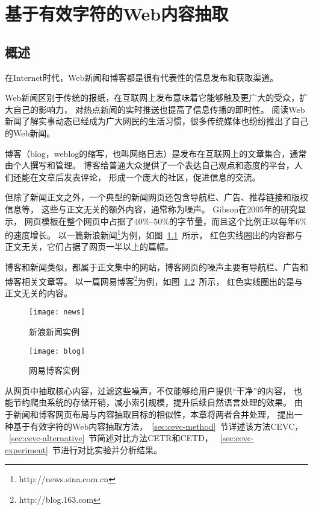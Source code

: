 
\chapter{基于有效字符的Web内容抽取}

\section{概述}
在Internet时代，Web新闻和博客都是很有代表性的信息发布和获取渠道。

Web新闻区别于传统的报纸，在互联网上发布意味着它能够触及更广大的受众，扩大自己的影响力，
对热点新闻的实时推送也提高了信息传播的即时性。
阅读Web新闻了解实事动态已经成为广大网民的生活习惯，很多传统媒体也纷纷推出了自己的Web新闻。

博客（blog，weblog的缩写，也叫网络日志）是发布在互联网上的文章集合，通常由个人撰写和管理。
博客给普通大众提供了一个表达自己观点和态度的平台，人们还能在文章后发表评论，
形成一个庞大的社区，促进信息的交流。

但除了新闻正文之外，一个典型的新闻网页还包含导航栏、广告、推荐链接和版权信息等，
这些与正文无关的额外内容，通常称为噪声。
Gibson在2005年的研究\cite{gibson2005volume}显示，
网页模板在整个网页中占据了$40\%$--$50\%$的字节量，而且这个比例正以每年$6\%$的速度增长。
以一篇新浪新闻\footnote{http://news.sina.com.cn}为例，如图~\ref{fig:news}~所示，
红色实线圈出的内容都与正文无关，它们占据了网页一半以上的篇幅。

博客和新闻类似，都属于正文集中的网站，博客网页的噪声主要有导航栏、广告和博客相关文章等。
以一篇网易博客\footnote{http://blog.163.com}为例，如图~\ref{fig:blog}~所示，
红色实线圈出的是与正文无关的内容。

\begin{figure}[htbp]
\centering
\texttt{[image: news]}
\caption{新浪新闻实例}
\label{fig:news}
\end{figure}

\begin{figure}[htbp]
\centering
\texttt{[image: blog]}
\caption{网易博客实例}
\label{fig:blog}
\end{figure}

从网页中抽取核心内容，过滤这些噪声，不仅能够给用户提供“干净”的内容，
也能节约爬虫系统的存储开销，减小索引规模，提升后续自然语言处理的效果。
由于新闻和博客网页布局与内容抽取目标的相似性，本章将两者合并处理，
提出一种基于有效字符的Web内容抽取方法，~\ref{sec:cevc-method}~节详述该方法CEVC，
~\ref{sec:cevc-alternative}~节简述对比方法CETR和CETD，
~\ref{sec:cevc-experiment}~节进行对比实验并分析结果。

